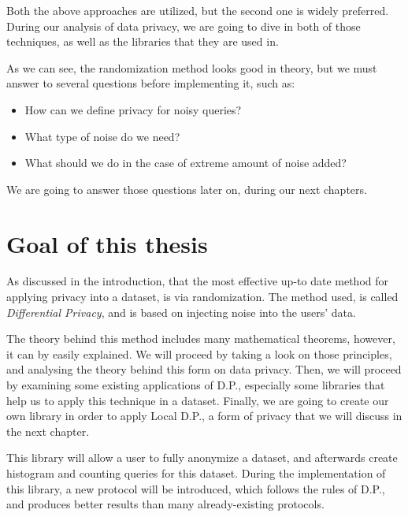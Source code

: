 Both the above approaches are utilized, but the second one is widely preferred. During our analysis of data privacy, we are going to dive in both of those techniques, as well as the libraries that they are used in.

\par As we can see, the randomization method looks good in theory, but we must answer to several questions before implementing it, such as:

\begin{itemize}
    \item How can we define privacy for noisy queries?
    \item What type of noise do we need?
    \item What should we do in the case of extreme amount of noise added?
\end{itemize}

We are going to answer those questions later on, during our next chapters. 

\section{Goal of this thesis}
As discussed in the introduction, that the most effective up-to date method for applying privacy into a dataset, is via randomization. The method used, is called \emph{Differential Privacy}, and is based on injecting noise into the users' data. 

The theory behind this method includes many mathematical theorems, however, it can by easily explained. We will proceed by taking a look on those principles, and analysing the theory behind this form on data privacy. Then, we will proceed by examining some existing applications of D.P., especially some libraries that help us to apply this technique in a dataset. Finally, we are going to create our own library in order to apply Local D.P., a form of privacy that we will discuss in the next chapter. 

This library will allow a user to fully anonymize a dataset, and afterwards create histogram and counting queries for this dataset. During the implementation of this library, a new protocol will be introduced, which follows the rules of D.P., and produces better results than many already-existing protocols.
